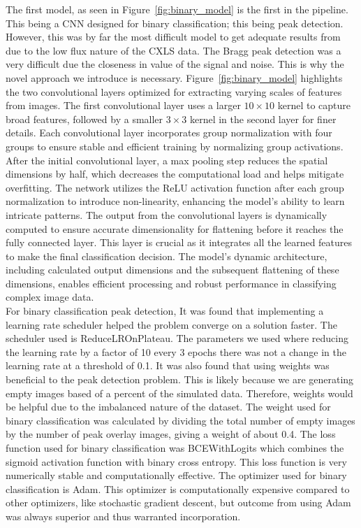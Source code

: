 \documentclass[12pt]{article}
\begin{document}
The first model, as seen in Figure~\ref{fig:binary_model} is the first in the pipeline. This being a CNN designed for binary classification; this being peak detection. However, this was by far the most difficult model to get adequate results from due to the low flux nature of the CXLS data. The Bragg peak detection was a very difficult due the closeness in value of the signal and noise. This is why the novel approach we introduce is necessary. Figure~\ref{fig:binary_model} highlights the two convolutional layers optimized for extracting varying scales of features from images. The first convolutional layer uses a larger \(10\times10\) kernel to capture broad features, followed by a smaller \(3\times3\) kernel in the second layer for finer details. Each convolutional layer incorporates group normalization with four groups to ensure stable and efficient training by normalizing group activations. After the initial convolutional layer, a max pooling step reduces the spatial dimensions by half, which decreases the computational load and helps mitigate overfitting. The network utilizes the ReLU activation function after each group normalization to introduce non-linearity, enhancing the model's ability to learn intricate patterns. The output from the convolutional layers is dynamically computed to ensure accurate dimensionality for flattening before it reaches the fully connected layer. This layer is crucial as it integrates all the learned features to make the final classification decision. The model's dynamic architecture, including calculated output dimensions and the subsequent flattening of these dimensions, enables efficient processing and robust performance in classifying complex image data.\\

For binary classification peak detection, It was found that implementing a learning rate scheduler helped the problem converge on a solution faster. The scheduler used is ReduceLROnPlateau. The parameters we used where reducing the learning rate by a factor of 10 every 3 epochs there was not a change in the learning rate at a threshold of 0.1. It was also found that using weights was beneficial to the peak detection problem. This is likely because we are generating empty images based of a percent of the simulated data. Therefore, weights would be helpful due to the imbalanced nature of the dataset. The weight used for binary classification was calculated by dividing the total number of empty images by the number of peak overlay images, giving a weight of about 0.4. The loss function used for binary classification was BCEWithLogits which combines the sigmoid activation function with binary cross entropy. This loss function is very numerically stable and computationally effective. The optimizer used for binary classification is Adam. This optimizer is computationally expensive compared to other optimizers, like stochastic gradient descent, but outcome from using Adam was always superior and thus warranted incorporation.\\
\end{document}
